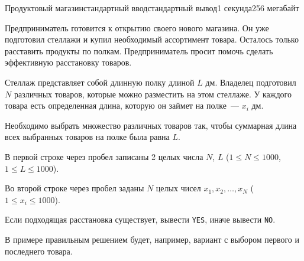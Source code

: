 \begin{problem}{Продуктовый магазин}{стандартный ввод}{стандартный вывод}{1 секунда}{256 мегабайт}

Предприниматель готовится к открытию своего нового магазина. Он уже подготовил стеллажи и купил необходимый ассортимент товара. Осталось только расставить продукты по полкам. Предприниматель просит помочь сделать эффективную расстановку товаров.

Стеллаж представляет собой длинную полку длиной $L$ дм. Владелец подготовил $N$ различных товаров, которые можно разместить на этом стеллаже. У каждого товара есть определенная длина, которую он займет на полке~--- $x_i$ дм.

Необходимо выбрать множество различных товаров так, чтобы суммарная длина всех выбранных товаров на полке была равна $L$.

\InputFile
В первой строке через пробел записаны 2 целых числа $N$, $L$ ($1 \leq N \leq 1000$, $1 \leq L \leq 1000$).

Во второй строке через пробел заданы $N$ целых чисел $x_1, x_2, \ldots, x_N$ ($1 \leq x_i \leq 1000$).

\OutputFile
Если подходящая расстановка существует, вывести \texttt{YES}, иначе вывести \texttt{NO}.

\Example

\begin{example}
%
\end{example}

\Note
В примере правильным решением будет, например, вариант с выбором первого и последнего товара.

\end{problem}

